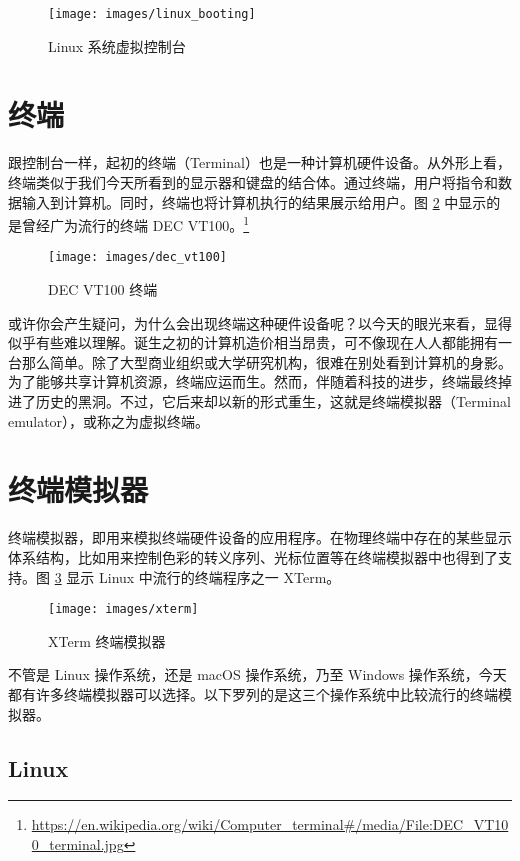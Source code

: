 \documentclass[]{ctexbook}
\begin{document}
\begin{figure}
\texttt{[image: images/linux\_booting]} \caption{Linux 系统虚拟控制台}\label{fig:linux-booting}
\end{figure}

\hypertarget{ux7ec8ux7aef}{%
\section{终端}\label{ux7ec8ux7aef}}

跟控制台一样，起初的终端（Terminal）也是一种计算机硬件设备。从外形上看，终端类似于我们今天所看到的显示器和键盘的结合体。通过终端，用户将指令和数据输入到计算机。同时，终端也将计算机执行的结果展示给用户。图 \ref{fig:dec-vt100} 中显示的是曾经广为流行的终端 DEC VT100。\footnote{\url{https://en.wikipedia.org/wiki/Computer_terminal\#/media/File:DEC_VT100_terminal.jpg}}

\begin{figure}
\texttt{[image: images/dec\_vt100]} \caption{DEC VT100 终端}\label{fig:dec-vt100}
\end{figure}

或许你会产生疑问，为什么会出现终端这种硬件设备呢？以今天的眼光来看，显得似乎有些难以理解。诞生之初的计算机造价相当昂贵，可不像现在人人都能拥有一台那么简单。除了大型商业组织或大学研究机构，很难在别处看到计算机的身影。为了能够共享计算机资源，终端应运而生。然而，伴随着科技的进步，终端最终掉进了历史的黑洞。不过，它后来却以新的形式重生，这就是终端模拟器（Terminal emulator），或称之为虚拟终端。

\hypertarget{term}{%
\section{终端模拟器}\label{term}}

终端模拟器，即用来模拟终端硬件设备的应用程序。在物理终端中存在的某些显示体系结构，比如用来控制色彩的转义序列、光标位置等在终端模拟器中也得到了支持。图 \ref{fig:xterm} 显示 Linux 中流行的终端程序之一 XTerm。

\begin{figure}
\texttt{[image: images/xterm]} \caption{XTerm 终端模拟器}\label{fig:xterm}
\end{figure}

不管是 Linux 操作系统，还是 macOS 操作系统，乃至 Windows 操作系统，今天都有许多终端模拟器可以选择。以下罗列的是这三个操作系统中比较流行的终端模拟器。

\hypertarget{linux}{%
\subsection{Linux}\label{linux}}
\end{document}
